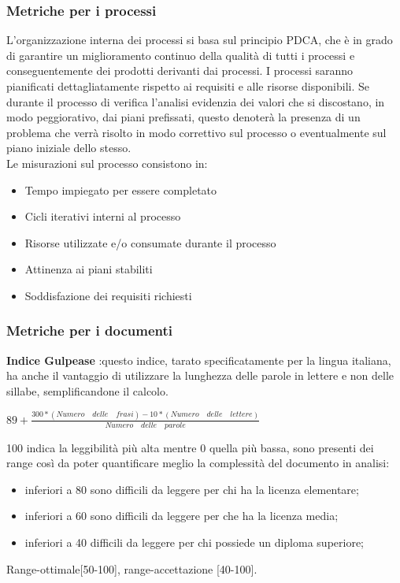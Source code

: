 		\subsubsection{Metriche per i processi}
		L'organizzazione interna dei processi si basa sul principio PDCA, che è in grado di garantire un miglioramento continuo della qualità di tutti i processi e conseguentemente dei prodotti derivanti dai processi.
I processi saranno pianificati dettagliatamente rispetto ai requisiti e alle risorse disponibili. Se durante il processo di verifica l'analisi evidenzia dei valori che si discostano, in modo peggiorativo, dai piani prefissati, questo denoterà la presenza di un problema che verrà risolto in modo correttivo sul processo o eventualmente sul piano iniziale dello stesso.\\
		Le misurazioni sul processo consistono in:
			\begin{itemize}
				\item Tempo impiegato per essere completato
				\item Cicli iterativi interni al processo
				\item Risorse utilizzate e/o consumate durante il processo
				\item Attinenza ai piani stabiliti
				\item Soddisfazione dei requisiti richiesti
			\end{itemize}

		\subsubsection{Metriche per i documenti}
		\textbf{Indice Gulpease} :questo indice, tarato specificatamente per la lingua italiana, ha anche il vantaggio di utilizzare la lunghezza delle parole in lettere e non delle sillabe, semplificandone il calcolo.
			\begin{center}
				\begin{math}
					89+\frac{300*(Numero\quad delle\quad frasi)-10*(Numero\quad delle\quad lettere)}{Numero\quad delle\quad parole}
				\end{math}
			\end{center}
		100 indica la leggibilità più alta mentre 0 quella più bassa, sono presenti dei range così da poter quantificare meglio la complessità del documento in analisi:
			\begin{itemize}
				\item inferiori a 80 sono difficili da leggere per chi ha la licenza elementare;
				\item inferiori a 60 sono difficili da leggere per che ha la licenza media;
				\item inferiori a 40 difficili da leggere per chi possiede un diploma superiore;
			\end{itemize}
		Range-ottimale[50-100], range-accettazione [40-100].

